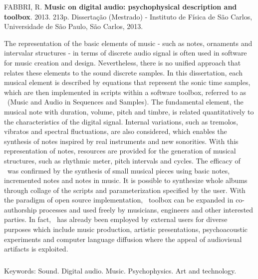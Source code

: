 \begin{abstract2}
\vspace{-10mm}
FABBRI, R. \textbf{Music on digital audio: psychophysical description and toolbox}. 2013. 213p. Dissertação (Mestrado) - Instituto de Física de São Carlos, Universidade de São Paulo, São Carlos, 2013.
\vspace{15mm}

The representation of the basic elements of music - such as notes, ornaments and intervalar structures - in terms of discrete audio signal is often used in software for music creation and design. Nevertheless, there is no unified approach that relates these elements to the sound discrete samples. In this dissertation, each musical element is described by equations that represent the sonic time samples, which are then implemented in scripts within a software toolbox, referred to as \massa\ (Music and Audio in Sequences and Samples). The fundamental element, the musical note with duration, volume, pitch and timbre, is related quantitatively to the characteristics of the digital signal. Internal variations, such as tremolos, vibratos and spectral fluctuations, are also considered, which enables the synthesis of notes inspired by real instruments and new sonorities. With this representation of notes, resources are provided for the generation of musical structures, such as rhythmic meter, pitch intervals and cycles. The efficacy of \massa\ was confirmed by the synthesis of small musical pieces using basic notes, incremented notes and notes in music. It is possible to synthesize whole albums through collage of the scripts and parameterization specified by the user. With the paradigm of open source implementation, \massa\ toolbox can be expanded in co-authorship processes and used freely by musicians, engineers and other interested parties. In fact, \massa\ has already been employed by external users for diverse purposes which include music production, artistic presentations, psychoacoustic experiments and computer language diffusion where the appeal of audiovisual artifacts is exploited.


$\phantom{linha em branco}$\\
Keywords: Sound. Digital audio. Music. Psychophysics. Art and technology.


\end{abstract2}
